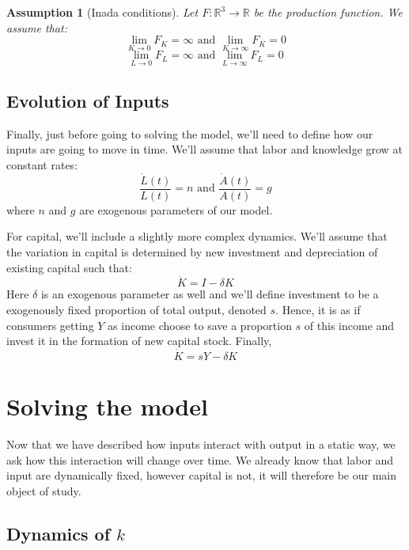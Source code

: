 \documentclass[12pt]{report}
\newtheorem{assumption}{Assumption}[chapter]
\begin{document}
\begin{assumption}[Inada conditions]
Let $F:\mathbb{R}^3\to\mathbb{R}$ be the production function. We assume that:$$ \lim_{K\to 0} F_K = \infty\text{ and }\lim_{K\to\infty} F_K = 0 $$
$$ \lim_{L\to 0} F_L = \infty\text{ and }\lim_{L\to\infty} F_L = 0$$
\end{assumption}

\subsection{Evolution of Inputs}

Finally, just before going to solving the model, we'll need to define how our inputs are going to move in time. We'll assume that labor and knowledge grow at constant rates: $$\frac{\dot{L}(t)}{L(t)} = n \text{ and } \frac{\dot{A}(t)}{A(t)} = g $$ where $n$ and $g$ are exogenous parameters of our model.

For capital, we'll include a slightly more complex dynamics. We'll assume that the variation in capital is determined by new investment and depreciation of existing capital such that: $$\dot{K} = I - \delta K$$ Here $\delta$ is an exogenous parameter as well and we'll define investment to be a exogenously fixed proportion of total output, denoted $s$. Hence, it is as if consumers getting $Y$ as income choose to save a proportion $s$ of this income and invest it in the formation of new capital stock. Finally, $$\dot{K} = sY - \delta K$$

\section{Solving the model}

Now that we have described how inputs interact with output in a static way, we ask how this interaction will change over time. We already know that labor and input are dynamically fixed, however capital is not, it will therefore be our main object of study.

\subsection{Dynamics of $k$}
\end{document}
